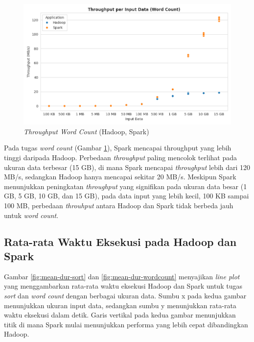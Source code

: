 \begin{figure}[h]
    \centering
    \includegraphics[width=1\textwidth]{figures/ch04/1-throughput-wordcount.png}
    \caption{\textit{Throughput Word Count} (Hadoop, Spark)}
    \label{fig:throughput-wordcount}
\end{figure}

Pada tugas \textit{word count} (Gambar \ref{fig:throughput-wordcount}), Spark mencapai throughput yang lebih tinggi daripada Hadoop. Perbedaan \textit{throughput} paling mencolok terlihat pada ukuran data terbesar (15 GB), di mana Spark mencapai \textit{throughput} lebih dari 120 MB/s, sedangkan Hadoop hanya mencapai sekitar 20 MB/s. Meskipun Spark menunjukkan peningkatan \textit{throughput} yang signifikan pada ukuran data besar (1 GB, 5 GB, 10 GB, dan 15 GB), pada data input yang lebih kecil, 100 KB sampai 100 MB, perbedaan \textit{throuhput} antara Hadoop dan Spark tidak berbeda jauh untuk \textit{word count}.


\subsection {Rata-rata Waktu Eksekusi pada Hadoop dan Spark}

Gambar \ref{fig:mean-dur-sort} dan \ref{fig:mean-dur-wordcount} menyajikan \textit{line plot} yang menggambarkan rata-rata waktu eksekusi Hadoop dan Spark untuk tugas \textit{sort} dan \textit{word count} dengan berbagai ukuran data. Sumbu x pada kedua gambar menunjukkan ukuran input data, sedangkan sumbu y menunjukkan rata-rata waktu eksekusi dalam detik. Garis vertikal pada kedua gambar menunjukkan titik di mana Spark mulai menunjukkan performa yang lebih cepat dibandingkan Hadoop.

